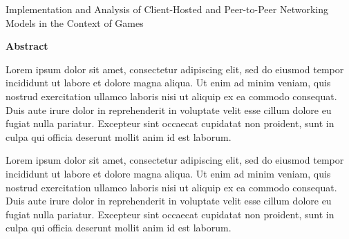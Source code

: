 \thispagestyle{plain}
\begin{center}
  \makeatletter
  \Large
  \textbf{\@title}

  \vspace*{0.4cm}
  \large
  Implementation and Analysis of Client-Hosted and Peer-to-Peer Networking Models in the Context of Games

  \vspace*{0.4cm}
  \textbf{\@author}

  \vspace*{0.9cm}
  \textbf{Abstract}
  \makeatother
\end{center}
Lorem ipsum dolor sit amet, consectetur adipiscing elit, sed do eiusmod tempor incididunt ut labore et dolore magna aliqua. Ut enim ad minim veniam, quis nostrud exercitation ullamco laboris nisi ut aliquip ex ea commodo consequat. Duis aute irure dolor in reprehenderit in voluptate velit esse cillum dolore eu fugiat nulla pariatur. Excepteur sint occaecat cupidatat non proident, sunt in culpa qui officia deserunt mollit anim id est laborum.

Lorem ipsum dolor sit amet, consectetur adipiscing elit, sed do eiusmod tempor incididunt ut labore et dolore magna aliqua. Ut enim ad minim veniam, quis nostrud exercitation ullamco laboris nisi ut aliquip ex ea commodo consequat. Duis aute irure dolor in reprehenderit in voluptate velit esse cillum dolore eu fugiat nulla pariatur. Excepteur sint occaecat cupidatat non proident, sunt in culpa qui officia deserunt mollit anim id est laborum.

